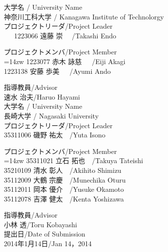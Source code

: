 \begin{center}
\newpage
\thispagestyle{empty}
{\normalsize 大学名 / University Name\\[-1mm]神奈川工科大学 / Kanagawa Institute of Technolorgy}\\[5mm]
{\normalsize プロジェクトリーダ/Project Leader}\\[-1mm]
\ \ \ 1223066 遠藤 崇 \ \ /Takashi Endo\\[10mm]
\begin{center}
プロジェクトメンバ/Project Member\\
\leftskip=14zw
1223077 赤木 詠慈\ \ \ /Eiji Akagi\\
1223138 安藤 歩美\ \ \ /Ayumi Ando\\
\end{center}
指導教員/Advisor\\[-1mm]
速水 治夫/Haruo Hayami\\[10mm]

{\normalsize 大学名 / University Name\\[-1mm]長崎大学 / Nagasaki University}\\[5mm]
{\normalsize プロジェクトリーダ/Project Leader}\\[-1mm]
35311006 磯野 祐太\ \  /Yuta Isono\\[10mm]
\begin{center}
プロジェクトメンバ/Project Member\\
\leftskip=14zw
35311021 立石 拓也\ \ /Takuya Tateishi\\
35210109 清水 彰人\ \ /Akihito Shimizu\\
35112009 大鶴 宗慶\ \ /Munechika Oturu\\
35112011 岡本 優介\ \ /Yusuke Okamoto\\
35112078 吉澤 健太\ \ /Kenta Yoshizawa\\
\end{center}
指導教員/Advisor\\
小林 透/Toru Kobayashi\\[10mm]

提出日/Date of Submission\\
2014年1月14日/Jan 14，2014\\
\end{center}
